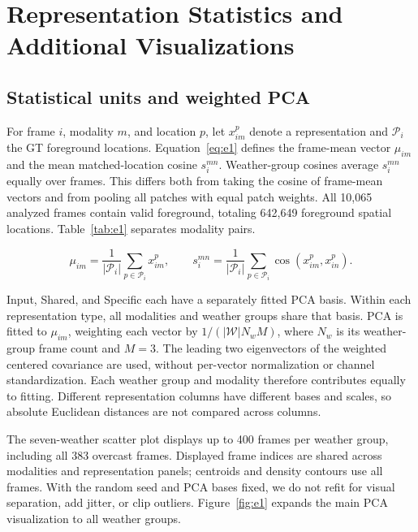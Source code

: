 \section{Representation Statistics and Additional Visualizations}
\label{app:e}

\subsection{Statistical units and weighted PCA}
\label{subsec:e1}

For frame \(i\), modality \(m\), and location \(p\), let \(x_{im}^p\) denote a representation and \(\mathcal P_i\) the GT foreground locations. Equation~\eqref{eq:e1} defines the frame-mean vector \(\mu_{im}\) and the mean matched-location cosine \(s_i^{mn}\). Weather-group cosines average \(s_i^{mn}\) equally over frames. This differs both from taking the cosine of frame-mean vectors and from pooling all patches with equal patch weights. All 10,065 analyzed frames contain valid foreground, totaling 642,649 foreground spatial locations. Table~\ref{tab:e1} separates modality pairs.

\begin{equation}
\mu_{im}=\frac{1}{|\mathcal P_i|}\sum_{p\in\mathcal P_i}x_{im}^p,\qquad
s_i^{mn}=\frac{1}{|\mathcal P_i|}\sum_{p\in\mathcal P_i}\operatorname{cos}(x_{im}^p,x_{in}^p).
\label{eq:e1}
\end{equation}

Input, Shared, and Specific each have a separately fitted PCA basis. Within each representation type, all modalities and weather groups share that basis. PCA is fitted to \(\mu_{im}\), weighting each vector by \(1/(|\mathcal W|N_wM)\), where \(N_w\) is its weather-group frame count and \(M=3\). The leading two eigenvectors of the weighted centered covariance are used, without per-vector normalization or channel standardization. Each weather group and modality therefore contributes equally to fitting. Different representation columns have different bases and scales, so absolute Euclidean distances are not compared across columns.

The seven-weather scatter plot displays up to 400 frames per weather group, including all 383 overcast frames. Displayed frame indices are shared across modalities and representation panels; centroids and density contours use all frames. With the random seed and PCA bases fixed, we do not refit for visual separation, add jitter, or clip outliers. Figure~\ref{fig:e1} expands the main PCA visualization to all weather groups.

